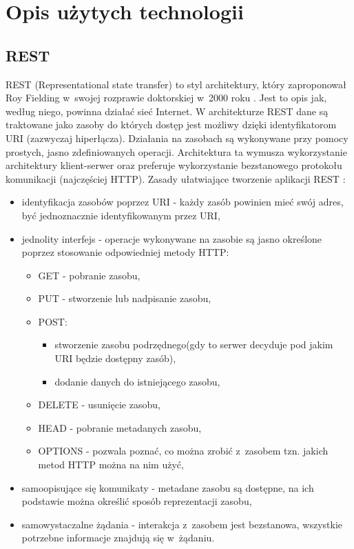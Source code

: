 {\let\clearpage\relax \section{Opis użytych technologii}}

\subsection{REST}
REST (Representational state transfer) to styl architektury, który zaproponował Roy Fielding w~swojej rozprawie doktorskiej w~2000 roku \cite{rest_Roy}. Jest to opis jak, według niego, powinna działać sieć Internet. W architekturze REST dane są traktowane jako zasoby do których dostęp jest możliwy dzięki identyfikatorom URI (zazwyczaj hiperłącza). Działania na zasobach są wykonywane przy pomocy prostych, jasno zdefiniowanych operacji. Architektura ta wymusza wykorzystanie architektury klient-serwer oraz preferuje wykorzystanie bezstanowego protokołu komunikacji (najczęściej HTTP). Zasady ułatwiające tworzenie aplikacji REST \cite{rest_book}:
\begin{itemize}
	\item identyfikacja zasobów poprzez URI - każdy zasób powinien mieć swój
                adres, być jednoznacznie
                identyfikowanym przez URI,
	\item jednolity interfejs - operacje wykonywane na zasobie są jasno
                określone poprzez stosowanie odpowiedniej metody HTTP:
	\begin{itemize}
		\item GET - pobranie zasobu,
		\item PUT - stworzenie lub nadpisanie zasobu,
                \item POST:
                \begin{itemize}
			\item stworzenie zasobu podrzędnego(gdy to serwer decyduje pod jakim URI będzie dostępny zasób),
			\item dodanie danych do istniejącego zasobu,
		\end{itemize} 
		\item DELETE - usunięcie zasobu,
		\item HEAD - pobranie metadanych zasobu,
		\item OPTIONS - pozwala poznać, co można zrobić z~zasobem tzn. jakich metod HTTP można na nim użyć,
	\end{itemize}
	\item samoopisujące się komunikaty - metadane zasobu są dostępne, na ich podstawie można określić sposób reprezentacji zasobu,
	\item samowystaczalne żądania - interakcja z~zasobem jest bezstanowa, wszystkie potrzebne informacje znajdują się w~żądaniu.
\end{itemize}

